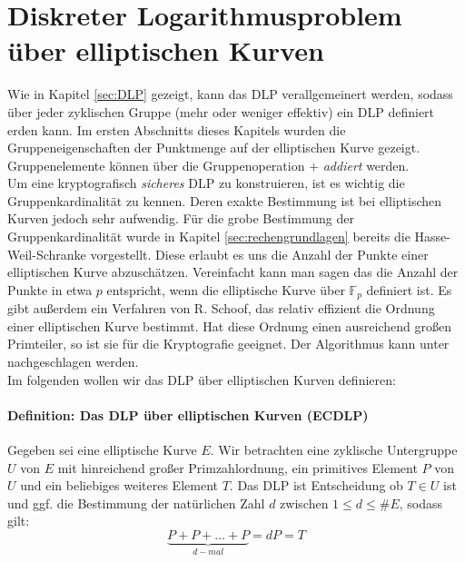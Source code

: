 \section{Diskreter Logarithmusproblem über elliptischen Kurven} \label{sec:DLPüberEC}
Wie in Kapitel \ref{sec:DLP} gezeigt, kann das DLP verallgemeinert werden, sodass über jeder zyklischen Gruppe (mehr oder weniger effektiv) ein DLP definiert erden kann. Im ersten Abschnitts dieses Kapitels wurden die Gruppeneigenschaften der Punktmenge auf der elliptischen Kurve gezeigt. Gruppenelemente können über die Gruppenoperation $+$ \textit{addiert} werden. \\


Um eine kryptografisch \textit{sicheres} DLP zu konstruieren, ist es wichtig die Gruppenkardinalität zu kennen. Deren exakte Bestimmung ist bei elliptischen Kurven jedoch sehr aufwendig. Für die grobe Bestimmung der Gruppenkardinalität wurde in Kapitel \ref{sec:rechengrundlagen} bereits die Hasse-Weil-Schranke vorgestellt. Diese erlaubt es uns die Anzahl der Punkte einer elliptischen Kurve abzuschätzen. Vereinfacht kann man sagen das die Anzahl der Punkte in etwa $p$ entspricht, wenn die elliptische Kurve über $\mathbb{F}_p$ definiert ist. Es gibt außerdem ein Verfahren von R. Schoof, das relativ effizient die Ordnung einer elliptischen Kurve bestimmt. Hat diese Ordnung einen ausreichend großen Primteiler, so ist sie für die Kryptografie geeignet. Der Algorithmus kann unter \cite[S. 219-254] {J.Theor.NombresBordaux.} nachgeschlagen werden.\\

Im folgenden wollen wir das DLP über elliptischen Kurven definieren:

\paragraph{Definition: Das DLP über elliptischen Kurven (ECDLP)}
Gegeben sei eine elliptische Kurve $E$. Wir betrachten eine zyklische Untergruppe $U$ von $E$ mit hinreichend großer Primzahlordnung, ein primitives Element $P$ von $U$ und ein beliebiges weiteres Element $T$. Das DLP ist Entscheidung ob $T \in U$ ist und ggf. die Bestimmung der natürlichen Zahl $d$ zwischen $1 \leq d \leq \#E$, sodass gilt:
$$\underbrace{P + P + \dots + P}_{d-mal} = d P = T$$\\

